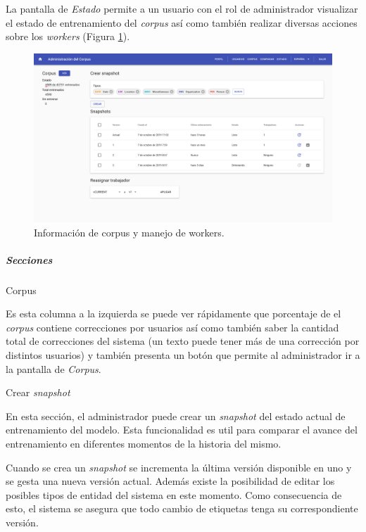 \documentclass[12pt,a4paper,]{scrartcl}
\let\oldsubparagraph\subparagraph
\renewcommand{\subparagraph}[1]{\oldsubparagraph{#1}\mbox{}}
\begin{document}
La pantalla de \emph{Estado} permite a un usuario con el rol de administrador visualizar el estado de entrenamiento del \emph{corpus} así como también realizar diversas acciones sobre los \emph{workers} (Figura \ref{fig:logic-status}).

\begin{figure}[H]

{\centering \includegraphics{assets/logic/status.pdf} 

}

\caption{Información de corpus y manejo de workers.}\label{fig:logic-status}
\end{figure}

\hypertarget{secciones}{%
\subparagraph{Secciones}\label{secciones}}

Corpus

Es esta columna a la izquierda se puede ver rápidamente que porcentaje de el \emph{corpus} contiene correcciones por usuarios así como también saber la cantidad total de correcciones del sistema (un texto puede tener más de una corrección por distintos usuarios) y también presenta un botón que permite al administrador ir a la pantalla de \emph{Corpus}.

Crear \emph{snapshot}

En esta sección, el administrador puede crear un \emph{snapshot} del estado actual de entrenamiento del modelo. Esta funcionalidad es util para comparar el avance del entrenamiento en diferentes momentos de la historia del mismo.

Cuando se crea un \emph{snapshot} se incrementa la última versión disponible en uno y se gesta una nueva versión actual. Además existe la posibilidad de editar los posibles tipos de entidad del sistema en este momento. Como consecuencia de esto, el sistema se asegura que todo cambio de etiquetas tenga su correspondiente versión.
\end{document}
